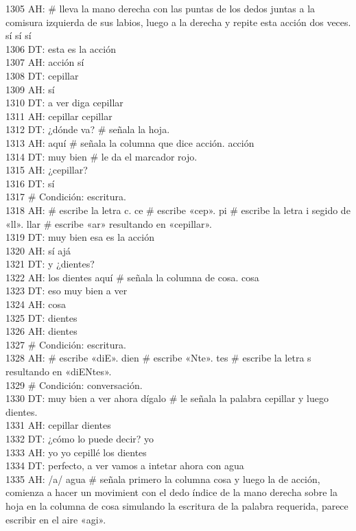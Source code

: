 1305 AH: # lleva la mano derecha con las puntas de los dedos juntas a la comisura izquierda de sus labios, luego a la derecha y repite esta acción dos veces. sí sí sí\\
1306 DT: esta es la acción\\
1307 AH: acción sí\\
1308 DT: cepillar\\
1309 AH: sí\\
1310 DT: a ver diga cepillar\\
1311 AH: cepillar cepillar\\
1312 DT: ¿dónde va? # señala la hoja.\\
1313 AH: aquí # señala la columna que dice acción. acción\\
1314 DT: muy bien # le da el marcador rojo.\\
1315 AH: ¿cepillar?\\
1316 DT: sí\\
1317 # Condición: escritura.\\
1318 AH: # escribe la letra c. ce # escribe «cep». pi # escribe la letra i segido de «ll». llar # escribe «ar» resultando en «cepillar».\\
1319 DT: muy bien esa es la acción\\
1320 AH: sí ajá\\
1321 DT: y ¿dientes?\\
1322 AH: los dientes aquí # señala la columna de cosa. cosa\\
1323 DT: eso muy bien a ver\\
1324 AH: cosa\\
1325 DT: dientes\\
1326 AH: dientes\\
1327 # Condición: escritura.\\
1328 AH: # escribe «diE». dien # escribe «Nte». tes # escribe la letra s resultando en «diENtes».\\
1329 # Condición: conversación.\\
1330 DT: muy bien a ver ahora dígalo # le señala la palabra cepillar y luego dientes.\\
1331 AH: cepillar dientes\\
1332 DT: ¿cómo lo puede decir? yo\\
1333 AH: yo yo cepillé los dientes\\
1334 DT: perfecto, a ver vamos a intetar ahora con agua\\
1335 AH: /a/ agua # señala primero la columna cosa y luego la de acción, comienza a hacer un movimient con el dedo índice de la mano derecha sobre la hoja en la columna de cosa simulando la escritura de la palabra requerida, parece escribir en el aire «agi».\\
